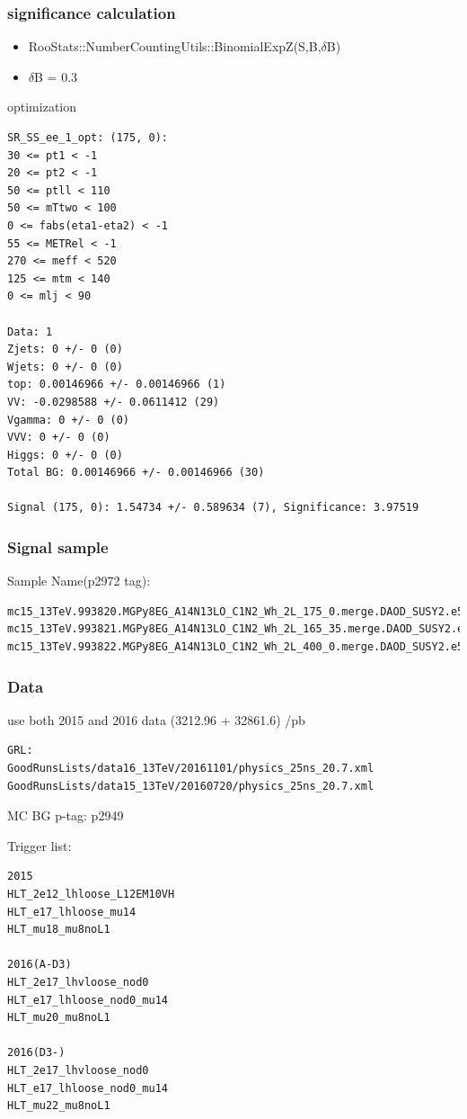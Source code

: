 \documentclass[mathserif,serif]{beamer}
\begin{document}
\begin{frame}
\frametitle{significance calculation}
\begin{itemize}
\item RooStats::NumberCountingUtils::BinomialExpZ(S,B,$\delta$B)
\item $\delta$B = 0.3
\end{itemize}
\end{frame}

\begin{frame}[fragile]{optimization}
\tiny
\begin{verbatim}
SR_SS_ee_1_opt: (175, 0):
30 <= pt1 < -1
20 <= pt2 < -1
50 <= ptll < 110
50 <= mTtwo < 100
0 <= fabs(eta1-eta2) < -1
55 <= METRel < -1
270 <= meff < 520
125 <= mtm < 140
0 <= mlj < 90

Data: 1
Zjets: 0 +/- 0 (0)
Wjets: 0 +/- 0 (0)
top: 0.00146966 +/- 0.00146966 (1)
VV: -0.0298588 +/- 0.0611412 (29)
Vgamma: 0 +/- 0 (0)
VVV: 0 +/- 0 (0)
Higgs: 0 +/- 0 (0)
Total BG: 0.00146966 +/- 0.00146966 (30)

Signal (175, 0): 1.54734 +/- 0.589634 (7), Significance: 3.97519
\end{verbatim}
\end{frame}

\begin{frame}[fragile]
\frametitle{Signal sample}
\small
Sample Name(p2972 tag):
\tiny
\begin{verbatim}
mc15_13TeV.993820.MGPy8EG_A14N13LO_C1N2_Wh_2L_175_0.merge.DAOD_SUSY2.e5678_a766_a821_r7676_p2949_p2972
mc15_13TeV.993821.MGPy8EG_A14N13LO_C1N2_Wh_2L_165_35.merge.DAOD_SUSY2.e5678_a766_a821_r7676_p2949_p2972
mc15_13TeV.993822.MGPy8EG_A14N13LO_C1N2_Wh_2L_400_0.merge.DAOD_SUSY2.e5678_a766_a821_r7676_p2949_p2972
\end{verbatim}
\end{frame}

\begin{frame}[fragile]
\frametitle{Data}
\small
use both 2015 and 2016 data (3212.96 + 32861.6) /pb
\tiny
\begin{verbatim}
GRL:
GoodRunsLists/data16_13TeV/20161101/physics_25ns_20.7.xml
GoodRunsLists/data15_13TeV/20160720/physics_25ns_20.7.xml
\end{verbatim}
\end{frame}

\begin{frame}{MC BG}
p-tag: p2949
\end{frame}

\begin{frame}[fragile]
\small
Trigger list:\\
\scriptsize
\begin{verbatim}
2015
HLT_2e12_lhloose_L12EM10VH
HLT_e17_lhloose_mu14
HLT_mu18_mu8noL1

2016(A-D3)
HLT_2e17_lhvloose_nod0
HLT_e17_lhloose_nod0_mu14
HLT_mu20_mu8noL1

2016(D3-)
HLT_2e17_lhvloose_nod0
HLT_e17_lhloose_nod0_mu14
HLT_mu22_mu8noL1
\end{verbatim}
\end{frame}
\end{document}
